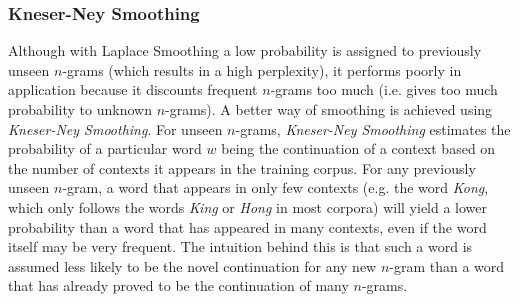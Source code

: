 \subsubsection{Kneser-Ney Smoothing}

Although with Laplace Smoothing a low probability is assigned to previously unseen $n$-grams (which results in a high perplexity), it performs poorly in application because it discounts frequent $n$-grams too much (i.e. gives too much probability to unknown $n$-grams). A better way of smoothing is achieved using \textit{Kneser-Ney Smoothing}. For unseen $n$-grams, \textit{Kneser-Ney Smoothing} estimates the probability of a particular word $w$ being the continuation of a context based on the number of contexts it appears in the training corpus. For any previously unseen $n$-gram, a word that appears in only few contexts (e.g. the word \textit{Kong}, which only follows the words \textit{King} or \textit{Hong} in most corpora) will yield a lower probability than a word that has appeared in many contexts, even if the word itself may be very frequent. The intuition behind this is that such a word is assumed less likely to be the novel continuation for any new $n$-gram than a word that has already proved to be the continuation of many $n$-grams.